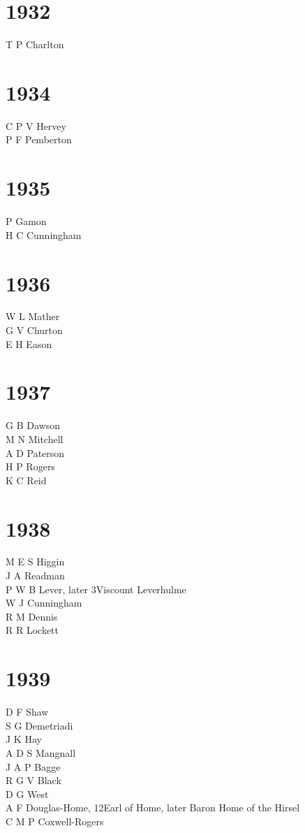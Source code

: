 \begin{multicols}{2}
  \section*{1932}
  T P Charlton \\
  \section*{1934}
  C P V Hervey \\
  P F Pemberton \\
  \section*{1935}
  P Gamon \\
  H C Cunningham \\
  \section*{1936}
  W L Mather \\
  G V Churton \\
  E H Eason \\
  \section*{1937}
  G B Dawson \\
  M N Mitchell \\
  A D Paterson \\
  H P Rogers \\
  K C Reid \\
  \section*{1938}
  M E S Higgin \\
  J A Readman \\
  P W B Lever, later 3\rd Viscount Leverhulme \\
  W J Cunningham \\
  R M Dennis \\
  R R Lockett \\
  \section*{1939}
  D F Shaw \\
  S G Demetriadi \\
  J K Hay \\
  A D S Mangnall \\
  J A P Bagge \\
  R G V Black \\
  D G West \\
  A F Douglas-Home, 12\nth Earl of Home, later Baron Home of the Hirsel \\
  C M P Coxwell-Rogers \\

\end{multicols}
